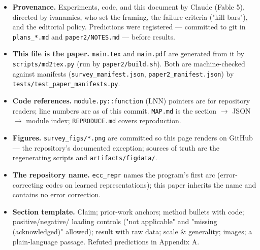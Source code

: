 \documentclass[10pt]{article}
\begin{document}
\begin{itemize}\setlength\itemsep{1pt}
\item \textbf{Provenance.} Experiments, code, and this document by Claude (Fable 5), directed by ivanamies, who set the framing, the failure criteria ("kill bars"), and the editorial policy. Predictions were registered --- committed to git in \texttt{plans\_*.md} and \texttt{paper2/NOTES.md} --- before results.
\item \textbf{This file is the paper.} \texttt{main.tex} and \texttt{main.pdf} are generated from it by \texttt{scripts/md2tex.py} (run by \texttt{paper2/build.sh}). Both are machine-checked against manifests (\texttt{survey\_manifest.json}, \texttt{paper2\_manifest.json}) by \texttt{tests/test\_paper\_manifests.py}.
\item \textbf{Code references.} \texttt{module.py::function} (LNN) pointers are for repository readers; line numbers are as of this commit. \texttt{MAP.md} is the section $\to$ JSON $\to$ module index; \texttt{REPRODUCE.md} covers reproduction.
\item \textbf{Figures.} \texttt{survey\_figs/*.png} are committed so this page renders on GitHub --- the repository's documented exception; sources of truth are the regenerating scripts and \texttt{artifacts/figdata/}.
\item \textbf{The repository name.} \texttt{ecc\_repr} names the program's first arc (error-correcting codes on learned representations); this paper inherits the name and contains no error correction.
\item \textbf{Section template.} Claim; prior-work anchors; method bullets with code; positive/negative/ loading controls ("not applicable" and "missing (acknowledged)" allowed); result with raw data; scale \& generality; images; a plain-language passage. Refuted predictions in Appendix A.
\end{itemize}
\end{document}

